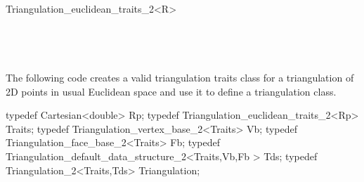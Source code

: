\begin{ccRefClass}{Triangulation_euclidean_traits_2<R>}
\ccSeeAlso
{} \\
 \\
\\
 \\
 \\

\ccExample
The following code creates a  valid triangulation traits class 
for a triangulation of 2D points in usual Euclidean space
and use it to define a triangulation class.

\begin{cprog}

typedef Cartesian<double> Rp;
typedef Triangulation_euclidean_traits_2<Rp> Traits;
typedef Triangulation_vertex_base_2<Traits> Vb;
typedef Triangulation_face_base_2<Traits> Fb;
typedef Triangulation_default_data_structure_2<Traits,Vb,Fb > Tds;
typedef Triangulation_2<Traits,Tds> Triangulation;

\end{cprog}


\end{ccRefClass}


